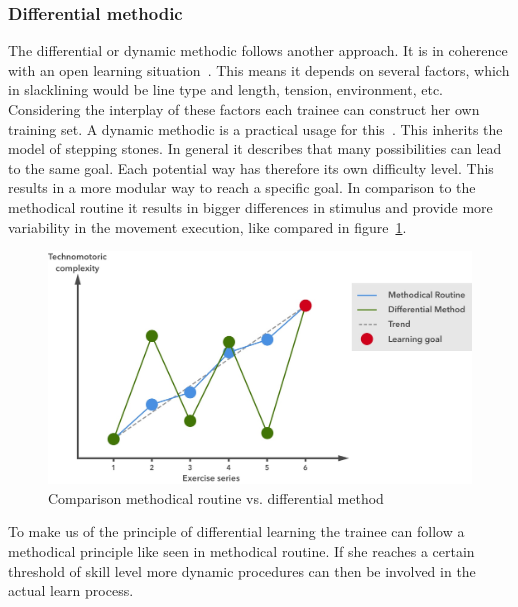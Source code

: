 \subsubsection{Differential methodic}
The differential or dynamic methodic follows another approach. It is in coherence with an open learning situation~\cite{Thomann2013-aa}. This means it depends on several factors, which in slacklining would be line type and length, tension, environment, etc. Considering the interplay of these factors each trainee can construct her own training set. A dynamic methodic is a practical usage for this~\cite{Beck2008-dl, Schoellhorn1999-ip}. This inherits the model of stepping stones. In general it describes that many possibilities can lead to the same goal. Each potential way has therefore its own difficulty level. This results in a more modular way to reach a specific goal. In comparison to the methodical routine it results in bigger differences in stimulus and provide more variability in the movement execution, like compared in figure~\ref{fig:3_3_1_comparisonMethods}. 

\begin{figure}[htb]
	\centering
	\begin{minipage}[t]{1\linewidth}
		\centering
		\includegraphics[width=0.83\linewidth]{Pictures/3_3_1_comparisonMethod2}
		\caption{Comparison methodical routine vs. differential method~\cite{Thomann2013-aa}}
		\label{fig:3_3_1_comparisonMethods}
	\end{minipage}
\end{figure}
To make us of the principle of differential learning the trainee can follow a methodical principle like seen in methodical routine. If she reaches a certain threshold of skill level more dynamic procedures can then be involved in the actual learn process. %

